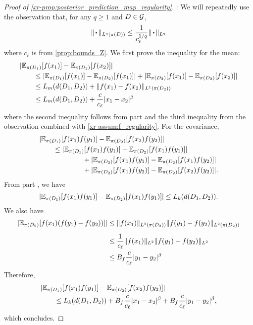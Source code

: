 \documentclass[12pt]{report}
\newcommand{\xrprefix}[1]{xr-#1}
\begin{document}
\begin{proof}[Proof of \ref{\xrprefix{prop:posterior_prediction_map_regularity}}]
    :
    We will repeatedly use the observation that, for any $q \ge 1$ and $D \in \mathcal{G}$,
    \begin{equation}
        \norm{\vardot}_{L^q(\pi(D))} \le \frac{1}{c_\ell^{1/q}} \norm{\vardot}_{L^q}
    \end{equation}
    where $c_\ell$ is from \cref{prop:bounds_Z}.
    We first prove the inequality for the mean:
    \begin{align}
        &\lvert\mathbb{E}_{\pi(D_1)}[f(x_1)] - \mathbb{E}_{\pi(D_2)}[f(x_2)]\rvert \nonumber \\
        &\qquad\le
            \lvert\mathbb{E}_{\pi(D_1)}[f(x_1)] - \mathbb{E}_{\pi(D_2)}[f(x_1)]\rvert
            + \lvert\mathbb{E}_{\pi(D_2)}[f(x_1)] - \mathbb{E}_{\pi(D_2)}[f(x_2)]\rvert \\
        &\qquad\le
            L_m(d(D_1, D_2))
            + \lVert f(x_1) - f(x_2)\rVert_{L^1(\pi(D_2))} \\
        &\qquad\le
            L_m(d(D_1, D_2))
            + \frac{c}{c_\ell} \lvert x_1 - x_2\rvert^\beta
    \end{align}
    where the second inequality follows from part  and the third inequality from the observation combined with \cref{\xrprefix{assum:f_regularity}}.
    For the covariance,
    \begin{align}
        &\lvert\mathbb{E}_{\pi(D_1)}[f(x_1)f(y_1)] - \mathbb{E}_{\pi(D_2)}[f(x_2)f(y_2)]\rvert \nonumber \\
        &\qquad\le
            \lvert\mathbb{E}_{\pi(D_1)}[f(x_1)f(y_1)] - \mathbb{E}_{\pi(D_2)}[f(x_1)f(y_1)]\rvert \nonumber \\
        &\qquad\;\qquad\qquad
            + \lvert\mathbb{E}_{\pi(D_2)}[f(x_1)f(y_1)] - \mathbb{E}_{\pi(D_2)}[f(x_1)f(y_2)]\rvert \nonumber \\
        &\qquad\;\qquad\qquad
            + \lvert\mathbb{E}_{\pi(D_2)}[f(x_1)f(y_2)] - \mathbb{E}_{\pi(D_2)}[f(x_2)f(y_2)]\rvert.
    \end{align}
    From part , we have
    \begin{equation}
        \lvert\mathbb{E}_{\pi(D_1)}[f(x_1)f(y_1)] - \mathbb{E}_{\pi(D_2)}[f(x_1)f(y_1)]\rvert
        \le L_k(d(D_1, D_2)).
    \end{equation}
    We also have
    \begin{align}
        \abs{\E_{\pi(D_2)}[f(x_1)(f(y_1) - f(y_2))]}
        &\le \vphantom{\frac{}{c_\ell}}\norm{f(x_1)}_{L^2(\pi(D_2))}\norm{f(y_1) - f(y_2)}_{L^2(\pi(D_2))} \\
        &\le \vphantom{\frac{B_f}{}}\frac1{c_\ell}
            \norm{f(x_1)}_{L^2} \norm{f(y_1) - f(y_2)}_{L^2} \\
        &\le B_f \frac{c}{c_\ell}
            \abs{y_1 - y_2}^\beta
    \end{align}
    Therefore,
    \begin{align}
        &\lvert\mathbb{E}_{\pi(D_1)}[f(x_1)f(y_1)] - \mathbb{E}_{\pi(D_2)}[f(x_2)f(y_2)]\rvert \nonumber \\
        &\qquad\le
            L_k(d(D_1, D_2))
            + B_f \frac{c}{c_\ell} \lvert x_1 - x_2\rvert^\beta
            + B_f \frac{c}{c_\ell} \lvert y_1 - y_2\rvert^\beta,
    \end{align}
    which concludes.
\end{proof}
\end{document}
